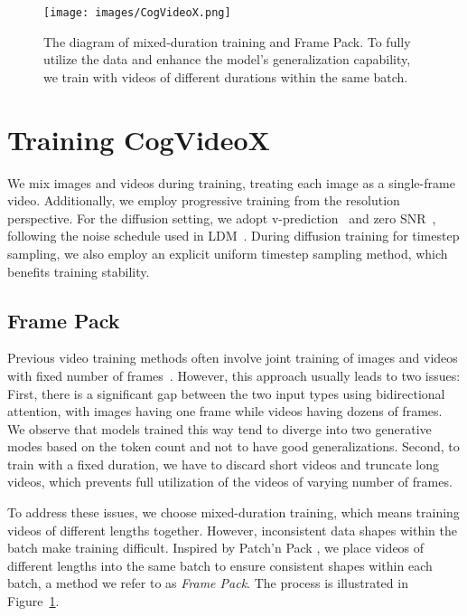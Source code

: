 \documentclass{article} \usepackage{iclr2024_conference,times}
\newcommand{\model}{CogVideoX\xspace}
\begin{document}
 \begin{figure}[ht]
\begin{center}
\texttt{[image: images/CogVideoX.png]}
\end{center}
\caption{
The diagram of mixed-duration training and Frame Pack. To fully utilize the data and enhance the model's generalization capability, we train with videos of different durations within the same batch.}
\label{fig:framepack}
\end{figure}

\section{Training \model}

We mix images and videos during training, treating each image as a single-frame video. 
Additionally, we employ progressive training from the resolution perspective. 
For the diffusion setting, we adopt v-prediction~\cite{salimans2022progressive} and zero SNR~\cite{lin2024common}, following the noise schedule used in LDM~\cite{rombach2022high}.
During diffusion training for timestep sampling, we also employ an explicit uniform timestep sampling method, which benefits training stability. 

\subsection{Frame Pack}
Previous video training methods often involve joint training of images and videos with fixed number of frames~\cite{singer2022make, blattmann2023stable}. 
However, this approach usually leads to two issues: 
First, there is a significant gap between the two input types using bidirectional attention, with images having one frame while videos having dozens of frames. 
We observe that models trained this way tend to diverge into two generative modes based on the token count and not to have good generalizations. Second, to train with a fixed duration, we have to discard short videos and truncate long videos, which prevents full utilization of the videos of varying number of frames.

To address these issues, we choose mixed-duration training, which means training videos of different lengths together. 
However, inconsistent data shapes within the batch make training difficult. 
Inspired by Patch'n Pack \cite{dehghani2024patch}, we place videos of different lengths into the same batch to ensure consistent shapes within each batch, a method we refer to as \textit{Frame Pack}. The process is illustrated in Figure~\ref{fig:framepack}. 
\end{document}
